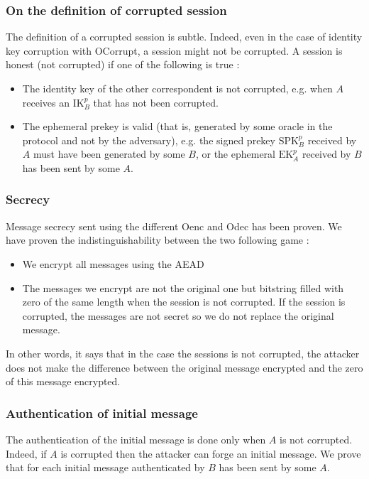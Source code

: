 \documentclass[a4paper, 10pt]{article}
\newcommand{\IK}[2]{\textrm{IK}_#1^#2}
\newcommand{\SPK}[2]{\textrm{SPK}_#1^#2}
\newcommand{\EK}[2]{\textrm{EK}_#1^#2}
\begin{document}
		\subsubsection{On the definition of corrupted session}
		The definition of a corrupted session is subtle. Indeed, even in the case of identity key corruption with OCorrupt, a session might not be corrupted. A session is honest (not corrupted) if one of the following is true :
		\begin{itemize}
			\item The identity key of the other correspondent is not corrupted, e.g. when $A$ receives an $\IK{B}{p}$ that has not been corrupted.
			\item The ephemeral prekey is valid (that is, generated by some oracle in the protocol and not by the adversary), e.g. the signed prekey $\SPK{B}{p}$ received by $A$ must have been generated by some $B$, or the ephemeral $\EK{A}{p}$ received by $B$ has been sent by some $A$.
		\end{itemize}
		
		\subsubsection{Secrecy}
		Message secrecy sent using the different Oenc and Odec has been proven. We have proven the indistinguishability between the two following game :
		\begin{itemize}
			\item We encrypt all messages using the AEAD
			\item The messages we encrypt are not the original one but bitstring filled with zero of the same length when the session is not corrupted. If the session is corrupted, the messages are not secret so we do not replace the original message.
		\end{itemize}
		
		In other words, it says that in the case the sessions is not corrupted, the attacker does not make the difference between the original message encrypted and the zero of this message encrypted.

		\subsubsection{Authentication of initial message}
		The authentication of the initial message is done only when $A$ is not corrupted. Indeed, if $A$ is corrupted then the attacker can forge an initial message.
		We prove that for each initial message authenticated by $B$ has been sent by some $A$.
		
\end{document}
